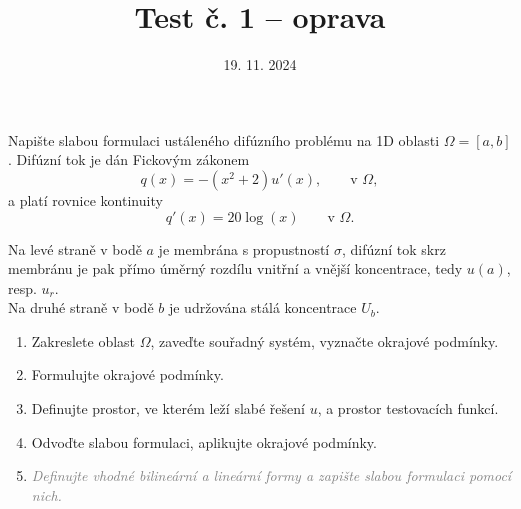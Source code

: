 \documentclass{article}
\begin{document}
\title{Test č. 1 -- oprava}
\date{19. 11. 2024}
\author{}
\maketitle


\noindent

Napište slabou formulaci ustáleného difúzního problému na 1D oblasti $\Omega=[a,b]$.
Difúzní tok je dán Fickovým zákonem
\[
    q(x) = -(x^2+2)u'(x), \qquad \textrm{v }\Omega,
\]
a platí rovnice kontinuity
\[
    q'(x) = 20\log(x) \qquad \textrm{v }\Omega.
\]

\noindent
Na levé straně v bodě $a$ je membrána s propustností $\sigma$, difúzní tok skrz membránu je pak přímo úměrný rozdílu vnitřní
a vnější koncentrace, tedy $u(a)$, resp. $u_r$.\\
Na druhé straně v bodě $b$ je udržována stálá koncentrace $U_b$.

\begin{enumerate}
\item Zakreslete oblast $\Omega$, zaveďte souřadný systém, vyznačte okrajové podmínky.
\item Formulujte okrajové podmínky.
\item Definujte prostor, ve kterém leží slabé řešení $u$, a prostor testovacích funkcí.
\item Odvoďte slabou formulaci, aplikujte okrajové podmínky.
\item \textit{\textcolor{gray}{Definujte vhodné bilineární a lineární formy a zapište slabou formulaci pomocí nich.}}
\end{enumerate}
\end{document}
